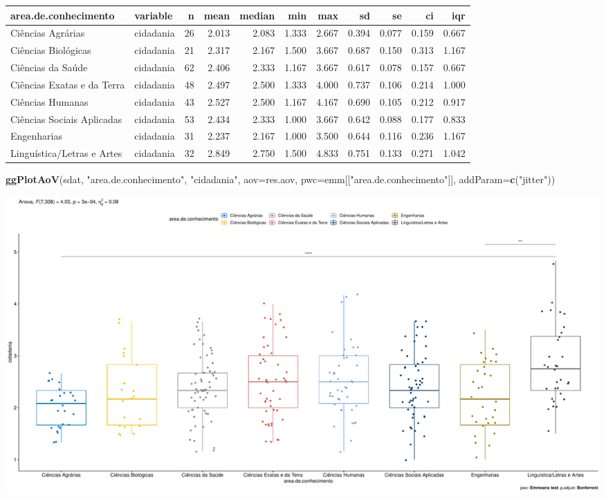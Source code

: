 \documentclass[]{article}
\newenvironment{Shaded}{\begin{snugshade}}{\end{snugshade}}
\newcommand{\DataTypeTok}[1]{\textcolor[rgb]{0.13,0.29,0.53}{#1}}
\newcommand{\KeywordTok}[1]{\textcolor[rgb]{0.13,0.29,0.53}{\textbf{#1}}}
\newcommand{\NormalTok}[1]{#1}
\newcommand{\StringTok}[1]{\textcolor[rgb]{0.31,0.60,0.02}{#1}}
\begin{document}
\begin{longtable}[]{@{}llrrrrrrrrr@{}}
\toprule
area.de.conhecimento & variable & n & mean & median & min & max & sd &
se & ci & iqr\tabularnewline
\midrule
\endhead
Ciências Agrárias & cidadania & 26 & 2.013 & 2.083 & 1.333 & 2.667 &
0.394 & 0.077 & 0.159 & 0.667\tabularnewline
Ciências Biológicas & cidadania & 21 & 2.317 & 2.167 & 1.500 & 3.667 &
0.687 & 0.150 & 0.313 & 1.167\tabularnewline
Ciências da Saúde & cidadania & 62 & 2.406 & 2.333 & 1.167 & 3.667 &
0.617 & 0.078 & 0.157 & 0.667\tabularnewline
Ciências Exatas e da Terra & cidadania & 48 & 2.497 & 2.500 & 1.333 &
4.000 & 0.737 & 0.106 & 0.214 & 1.000\tabularnewline
Ciências Humanas & cidadania & 43 & 2.527 & 2.500 & 1.167 & 4.167 &
0.690 & 0.105 & 0.212 & 0.917\tabularnewline
Ciências Sociais Aplicadas & cidadania & 53 & 2.434 & 2.333 & 1.000 &
3.667 & 0.642 & 0.088 & 0.177 & 0.833\tabularnewline
Engenharias & cidadania & 31 & 2.237 & 2.167 & 1.000 & 3.500 & 0.644 &
0.116 & 0.236 & 1.167\tabularnewline
Linguística/Letras e Artes & cidadania & 32 & 2.849 & 2.750 & 1.500 &
4.833 & 0.751 & 0.133 & 0.271 & 1.042\tabularnewline
\bottomrule
\end{longtable}

\begin{Shaded}
\begin{Highlighting}[]
\KeywordTok{ggPlotAoV}\NormalTok{(sdat, }\StringTok{"area.de.conhecimento"}\NormalTok{, }\StringTok{"cidadania"}\NormalTok{, }\DataTypeTok{aov=}\NormalTok{res.aov, }\DataTypeTok{pwc=}\NormalTok{emm[[}\StringTok{"area.de.conhecimento"}\NormalTok{]], }\DataTypeTok{addParam=}\KeywordTok{c}\NormalTok{(}\StringTok{"jitter"}\NormalTok{))}
\end{Highlighting}
\end{Shaded}

\includegraphics{factorialAnova_files/figure-latex/unnamed-chunk-34-1.pdf}
\end{document}
